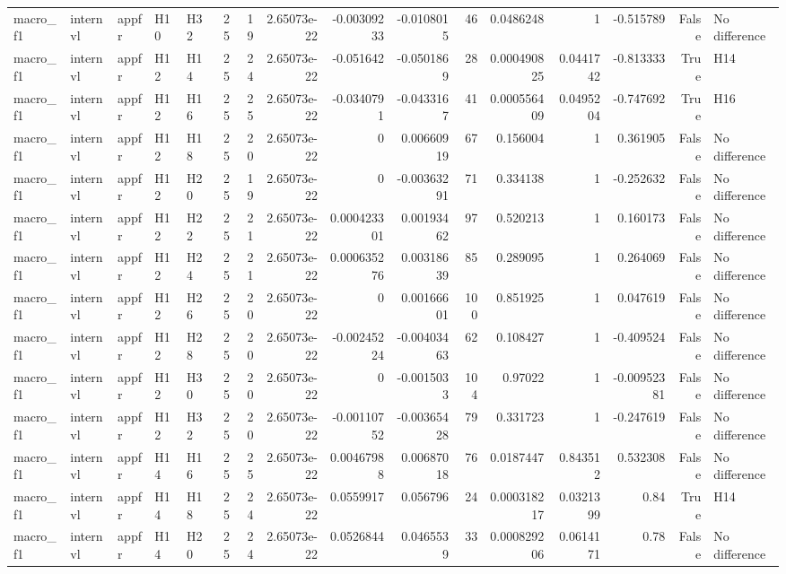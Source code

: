 \begin{longtable}{lllllrrrrrrrrrrl}
macro\_f1 & internvl & appfr & H10 & H32 & 25 & 19 & 2.65073e-22 & -0.00309233 & -0.0108015 & 46 & 0.0486248 & 1 & -0.515789 & False & No difference \\
macro\_f1 & internvl & appfr & H12 & H14 & 25 & 24 & 2.65073e-22 & -0.051642 & -0.0501869 & 28 & 0.000490825 & 0.0441742 & -0.813333 & True & H14 \\
macro\_f1 & internvl & appfr & H12 & H16 & 25 & 25 & 2.65073e-22 & -0.0340791 & -0.0433167 & 41 & 0.000556409 & 0.0495204 & -0.747692 & True & H16 \\
macro\_f1 & internvl & appfr & H12 & H18 & 25 & 20 & 2.65073e-22 & 0 & 0.00660919 & 67 & 0.156004 & 1 & 0.361905 & False & No difference \\
macro\_f1 & internvl & appfr & H12 & H20 & 25 & 19 & 2.65073e-22 & 0 & -0.00363291 & 71 & 0.334138 & 1 & -0.252632 & False & No difference \\
macro\_f1 & internvl & appfr & H12 & H22 & 25 & 21 & 2.65073e-22 & 0.000423301 & 0.00193462 & 97 & 0.520213 & 1 & 0.160173 & False & No difference \\
macro\_f1 & internvl & appfr & H12 & H24 & 25 & 21 & 2.65073e-22 & 0.000635276 & 0.00318639 & 85 & 0.289095 & 1 & 0.264069 & False & No difference \\
macro\_f1 & internvl & appfr & H12 & H26 & 25 & 20 & 2.65073e-22 & 0 & 0.00166601 & 100 & 0.851925 & 1 & 0.047619 & False & No difference \\
macro\_f1 & internvl & appfr & H12 & H28 & 25 & 20 & 2.65073e-22 & -0.00245224 & -0.00403463 & 62 & 0.108427 & 1 & -0.409524 & False & No difference \\
macro\_f1 & internvl & appfr & H12 & H30 & 25 & 20 & 2.65073e-22 & 0 & -0.0015033 & 104 & 0.97022 & 1 & -0.00952381 & False & No difference \\
macro\_f1 & internvl & appfr & H12 & H32 & 25 & 20 & 2.65073e-22 & -0.00110752 & -0.00365428 & 79 & 0.331723 & 1 & -0.247619 & False & No difference \\
macro\_f1 & internvl & appfr & H14 & H16 & 25 & 25 & 2.65073e-22 & 0.00467988 & 0.00687018 & 76 & 0.0187447 & 0.843512 & 0.532308 & False & No difference \\
macro\_f1 & internvl & appfr & H14 & H18 & 25 & 24 & 2.65073e-22 & 0.0559917 & 0.056796 & 24 & 0.000318217 & 0.0321399 & 0.84 & True & H14 \\
macro\_f1 & internvl & appfr & H14 & H20 & 25 & 24 & 2.65073e-22 & 0.0526844 & 0.0465539 & 33 & 0.000829206 & 0.0614171 & 0.78 & False & No difference \\

\end{longtable}
